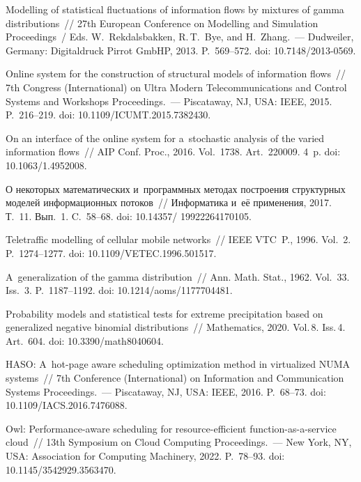 \begin{multicols}{2}
{{\begin{thebibliography}{99}
 Modelling of 
statistical fluctuations of information flows by mixtures of gamma 
distributions~// 27th European Conference on Modelling and Simulation Proceedings~/ 
Eds. W.~Rekdalsbakken, R.\,T.~Bye, and H.~Zhang.~--- Dudweiler, Germany: Digitaldruck Pirrot GmbHP, 2013. P.~569--572. 
doi: 10.7148/2013-0569.

 Online system for the 
construction of structural models of information flows~// 7th 
 Congress (International) on Ultra Modern Telecommunications and Control Systems  and 
Workshops Proceedings.~--- Piscataway, NJ, USA: IEEE, 2015. P.~216--219. doi: 10.1109/ICUMT.2015.7382430.

 On an interface of the 
online system for a~stochastic analysis of the varied information flows~// AIP 
Conf. Proc., 2016. Vol.~1738. Art.~220009. 4~p. doi: 10.1063/1.4952008.

 О некоторых математических и~программных методах по\-стро\-ения структурных моделей информационных 
потоков~// Информатика и~её применения, 2017. Т.~11. Вып.~1. C.~58--68. doi: 10.14357/ 19922264170105.

Teletraffic modelling of cellular mobile networks~// IEEE VTC~P., 1996. 
Vol.~2. P.~1274--1277. doi: 10.1109/VETEC.1996.501517.

 A~generalization of the gamma 
distribution~// Ann. Math. Stat., 1962. Vol.~33. Iss.~3. 
P.~1187--1192. doi: 10.1214/aoms/1177704481.

 Probability 
models and statistical tests for extreme precipitation based on generalized 
negative binomial distributions~// Mathematics, 2020. Vol.\,8. Iss.\,4. 
Art.~604. doi: 10.3390/math8040604.

HASO: A~hot-page aware scheduling optimization method in virtualized NUMA 
systems~// 7th  Conference (International) on Information and Communication 
Systems Proceedings.~--- Piscataway, NJ, USA: IEEE, 2016. P.~68--73. doi: 10.1109/IACS.2016.7476088.

Owl:  Performance-aware scheduling for resource-efficient function-as-a-service cloud~// 
13th Symposium on Cloud Computing Proceedings.~--- New York, NY, USA: 
Association for Computing Machinery, 2022. P.~78--93. doi: 10.1145/3542929.3563470.


\end{thebibliography}}}
\end{multicols}
